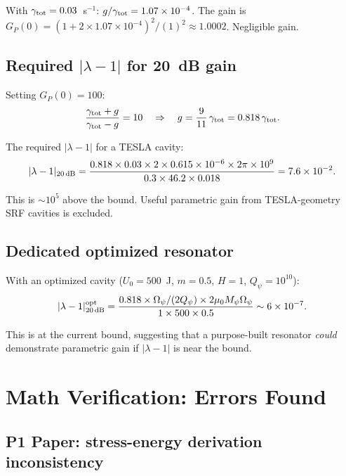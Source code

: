 \documentclass[11pt,twocolumn]{article}
\newcommand{\lam}{\lambda}
\newcommand{\Opsi}{\Omega_\psi}
\newcommand{\Mpsi}{M_\psi}
\begin{document}
With $\gamma_{\rm tot} = 0.03$~s$^{-1}$: $g/\gamma_{\rm tot} = 1.07\times10^{-4}$.
The gain is $G_P(0) = (1 + 2\times1.07\times10^{-4})^2/(1)^2 \approx 1.0002$.
Negligible gain.

\subsection{Required $|\lam-1|$ for 20~dB gain}

Setting $G_P(0) = 100$:
\begin{equation}
\frac{\gamma_{\rm tot} + g}{\gamma_{\rm tot} - g} = 10
\quad\Rightarrow\quad g = \frac{9}{11}\,\gamma_{\rm tot}
= 0.818\,\gamma_{\rm tot}.
\end{equation}

The required $|\lam-1|$ for a TESLA cavity:
\begin{equation}
|\lam-1|_{20\,\rm dB} = \frac{0.818 \times 0.03 \times 2 \times 0.615
\times 10^{-6} \times 2\pi\times10^9}{0.3 \times 46.2 \times 0.018}
= 7.6\times10^{-2}.
\label{eq:lambda_20dB}
\end{equation}

This is $\sim 10^5$ above the bound. Useful parametric gain from
TESLA-geometry SRF cavities is excluded.

\subsection{Dedicated optimized resonator}

With an optimized cavity ($U_0 = 500$~J, $m = 0.5$, $H = 1$,
$Q_\psi = 10^{10}$):
\begin{equation}
|\lam-1|_{20\,\rm dB}^{\rm opt} = \frac{0.818 \times \Opsi/(2Q_\psi)
\times 2\mu_0\Mpsi\Opsi}{1 \times 500 \times 0.5}
\sim 6\times10^{-7}.
\end{equation}

This is at the current bound, suggesting that a purpose-built resonator
\emph{could} demonstrate parametric gain if $|\lam-1|$ is near the bound.


\section{Math Verification: Errors Found}
\label{sec:errors}

\subsection{P1 Paper: stress-energy derivation inconsistency}
\end{document}

